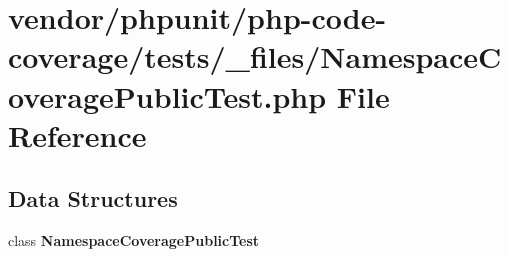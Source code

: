 \section{vendor/phpunit/php-\/code-\/coverage/tests/\+\_\+files/\+Namespace\+Coverage\+Public\+Test.php File Reference}
\label{php-code-coverage_2tests_2__files_2_namespace_coverage_public_test_8php}
\subsection*{Data Structures}
\begin{DoxyCompactItemize}
\item 
class {\bf Namespace\+Coverage\+Public\+Test}
\end{DoxyCompactItemize}

